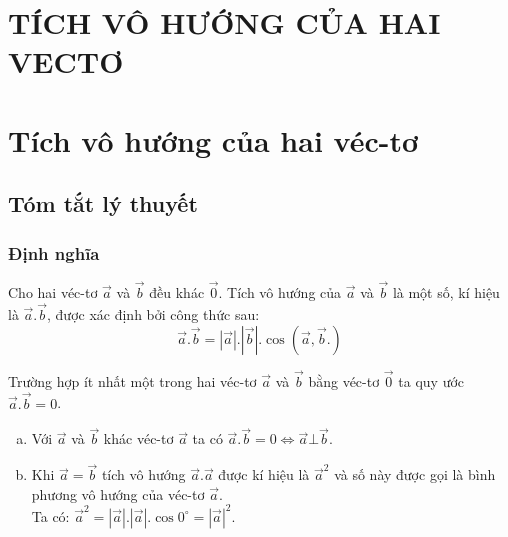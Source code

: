 \section{TÍCH VÔ HƯỚNG CỦA HAI VECTƠ}
\section{Tích vô hướng của hai véc-tơ}
\subsection{Tóm tắt  lý thuyết}
\subsubsection{Định nghĩa}
\begin{dn}
Cho hai véc-tơ $\vec{a}$ và $\vec{b}$ đều khác $\vec{0}$. Tích vô hướng của $\vec{a}$ và $\vec{b}$ là một số, kí hiệu là $\vec{a}.\vec{b}$, được xác định bởi công thức sau:
\[\vec{a}.\vec{b}=|\vec{a}|.|\vec{b}|.\cos(\vec{a},\vec{b}.)\]
\end{dn}
Trường hợp ít nhất một trong hai véc-tơ $\vec{a}$ và $\vec{b}$ bằng véc-tơ $\vec{0}$ ta quy ước $\vec{a}.\vec{b}=0$.

\begin{note}
	\hfill
\begin{enumerate}[a)]
	\item Với $\vec{a}$ và $\vec{b}$ khác véc-tơ $\vec{a}$ ta có $\vec{a}.\vec{b}=0\Leftrightarrow \vec{a}\bot\vec{b}$.
	\item Khi $\vec{a}=\vec{b}$ tích vô hướng $\vec{a}.\vec{a}$ được kí hiệu là $\vec{a}^2$ và số này được gọi là bình phương vô hướng của véc-tơ $\vec{a}$.\\
	Ta có: $\vec{a}^2=|\vec{a}|.|\vec{a}|.\cos0^{\circ}=|\vec{a}|^2$.
\end{enumerate}
\end{note}
